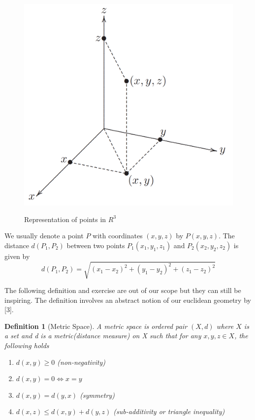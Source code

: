 \documentclass[12pt]{article}
\newtheorem{defn}{Definition}[section]
\begin{document}
\begin{center}
\begin{figure}[h]
  \centering
  \includegraphics[width=\linewidth/3]{figures/fig1.png}
  \label{fig:1}
  \caption{Representation of points in $R^3$}
\end{figure}
\end{center}

We usually denote a point $P$ with coordinates $(x,y,z)$ by $P(x,y,z)$. The distance
$d(P_1, P_2)$ between two points $P_1(x_1,y_1,z_1)$ and $P_2(x_2,y_2,z_2)$ is given by
$$ d(P_1, P_2) = \sqrt{ (x_1 - x_2)^2 + (y_1 - y_2)^2 + (z_1 - z_2)^2 } $$

The following definition and exercise are out of our scope but they can still be inspiring. The definition involves an abstract notion of our euclidean geometry by [3].

\begin{defn}[Metric Space]
  A metric space is ordered pair $(X,d)$ where $X$ is a set and d is a 
  metric(distance measure) on X such that for any $x,y,z \in X$, the following holds
  \begin{enumerate}
    \item $d(x,y) \geq 0$ \quad \quad \quad \quad \quad \quad \quad (non-negativity)
    \item $d(x,y) = 0 \iff x=y$ \quad 
    \item $d(x,y) = d(y,x)$ \quad \quad \quad \quad \quad (symmetry)
    \item $d(x,z) \leq d(x,y) + d(y,z)$ \quad (sub-additivity or triangle inequality)
  \end{enumerate}
\end{defn}
\end{document}
